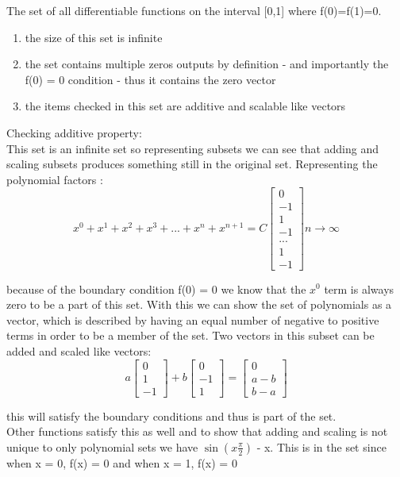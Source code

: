 \documentclass[12pt]{article}
\begin{document}
The set of all differentiable functions on the interval [0,1] where f(0)=f(1)=0.\\
\begin{enumerate}
\item the size of this set is infinite
\item the set contains multiple zeros outputs by definition - and importantly the f(0) = 0 condition - thus it contains the zero vector
\item the items checked in this set are additive and scalable like vectors
\end{enumerate}
Checking additive property:\\
This set is an infinite set so representing subsets we can see that adding and scaling subsets produces something still in the original set. Representing the polynomial factors :
\[
x^{0} + x^{1} + x^{2} + x^{3} + ... + x^{n} + x^{n+1} = C
\begin{bmatrix}
0\\
-1\\
1\\
-1\\
...\\
1\\
-1
\end{bmatrix}
n \rightarrow \infty
\]

because of the boundary condition f(0) = 0 we know that the $x^{0}$ term is always zero to be a part of this set. With this we can show the set of polynomials as a vector, which is described by having an equal number of negative to positive terms in order to be a member of the set. Two vectors in this subset can be added and scaled like vectors:
\[
a
\begin{bmatrix}
0\\
1\\
-1
\end{bmatrix}
+
b
\begin{bmatrix}
0\\
-1\\
1
\end{bmatrix}
=
\begin{bmatrix}
0\\
a - b\\
b - a
\end{bmatrix}
\]

this will satisfy the boundary conditions and thus is part of the set.\\

Other functions satisfy this as well and to show that adding and scaling is not unique to only polynomial sets we have $\sin (x\frac{\pi}{2})$ - x.
This is in the set since when x = 0, f(x) = 0 and when x = 1, f(x) = 0\\
\end{document}
